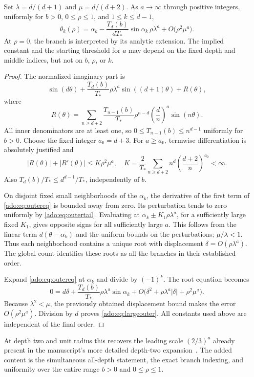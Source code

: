 \begin{theorem}
\label{ado:thm:largeouter}
Set $\lambda=d/(d+1)$ and $\mu=d/(d+2)$. As $a\to\infty$ through
positive integers, uniformly for $b>0$, $0\le\rho\le1$, and
$1\le k\le d-1$,
\begin{equation}\label{ado:eq:largeouter}
 \theta_k(\rho)
 =\alpha_k-\frac{T_d(b)}{dT_*}\sin\alpha_k\,
                      \rho\lambda^a
       +O\bigl(\rho^2\mu^a\bigr).
\end{equation}
At $\rho=0$, the branch is interpreted by its analytic extension.
The implied constant and the starting threshold for $a$ may depend on
the fixed depth and middle indices, but not on $b$, $\rho$, or $k$.
\end{theorem}
\begin{proof}
The normalized imaginary part is
\begin{equation}\label{ado:eq:outereq}
 \sin(d\theta)+\frac{T_d(b)}{T_*}\rho\lambda^a
                   \sin((d+1)\theta)+R(\theta),
\end{equation}
where
\[
 R(\theta)=\sum_{n\ge d+2}\frac{T_{n-1}(b)}{T_*}
        \rho^{n-d}\left(\frac dn\right)^a\sin(n\theta).
\]
All inner denominators are at least one, so
$0\le T_{n-1}(b)\le n^{d-1}$ uniformly for $b>0$. Choose the fixed
integer $a_0=d+3$. For $a\ge a_0$, termwise differentiation is
absolutely justified and
\begin{equation}\label{ado:eq:outertail}
 |R(\theta)|+|R'(\theta)|\le K\rho^2\mu^a,
 \quad
 K=\frac2{T_*}\sum_{n\ge d+2}n^d
                        \left(\frac{d+2}{n}\right)^{a_0}<\infty.
\end{equation}
Also $T_d(b)/T_*\le d^{d-1}/T_*$, independently of $b$.

On disjoint fixed small neighborhoods of the $\alpha_k$, the derivative
of the first term of \eqref{ado:eq:outereq} is bounded away from zero.
Its perturbation tends to zero uniformly by \eqref{ado:eq:outertail}.
Evaluating at $\alpha_k\pm K_1\rho\lambda^a$, for a sufficiently
large fixed $K_1$, gives opposite signs for all sufficiently large $a$.
This follows from the linear term $d(\theta-\alpha_k)$ and the
uniform bounds on the perturbations; $\mu/\lambda<1$. Thus each
neighborhood contains a unique root with displacement
$\delta=O(\rho\lambda^a)$. The global count identifies these roots
as all the branches in their established order.

Expand \eqref{ado:eq:outereq} at $\alpha_k$ and divide by $(-1)^k$.
The root equation becomes
\[
 0=d\delta+\frac{T_d(b)}{T_*}\rho\lambda^a\sin\alpha_k
     +O\bigl(\delta^2+\rho\lambda^a|\delta|
                         +\rho^2\mu^a\bigr).
\]
Because $\lambda^2<\mu$, the previously obtained displacement bound
makes the error $O(\rho^2\mu^a)$. Division by $d$ proves
\eqref{ado:eq:largeouter}. All constants used above are independent
of the final order.
\end{proof}
At depth two and unit radius this recovers the leading scale
$(2/3)^a$ already present in the manuscript's more detailed depth-two
expansion~\cite{ado:report}. The added content is the simultaneous
all-depth statement, the exact branch indexing, and uniformity over the
entire range $b>0$ and $0\le\rho\le1$.

